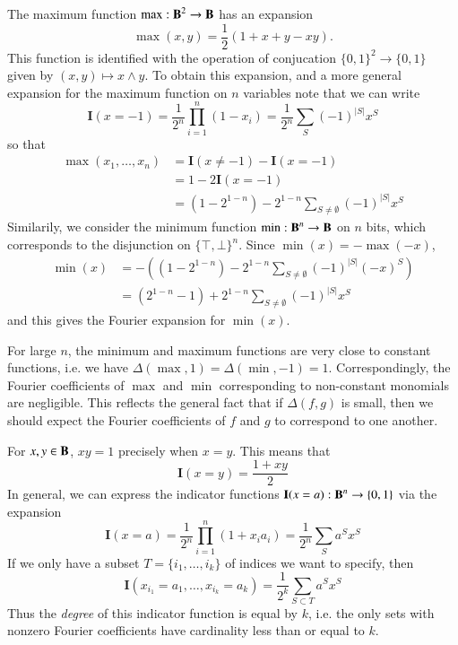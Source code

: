 \begin{example}
    The maximum function $\max: \operatorname{\mathbf{B}}^2 \to \operatorname{\mathbf{B}}$ has an expansion
    \[ \max(x,y) = \frac{1}{2} \left( 1 + x + y - xy \right). \]
    This function is identified with the operation of conjucation $\{ 0, 1 \}^2 \to \{ 0, 1 \}$ given by $(x,y) \mapsto x \wedge y$. To obtain this expansion, and a more general expansion for the maximum function on $n$ variables note that we can write
    \[ \mathbf{I}(x = -1) = \frac{1}{2^n} \prod_{i = 1}^n (1 - x_i) = \frac{1}{2^n} \sum_S (-1)^{|S|} x^S \]
    so that
    \begin{align*}
        \max(x_1, \dots, x_n) &= \mathbf{I}(x \neq -1) - \mathbf{I}(x = -1)\\
        &= 1 - 2 \mathbf{I}(x = -1)\\
        &= (1 - 2^{1-n}) - 2^{1-n} \sum_{S \neq \emptyset} (-1)^{|S|} x^S
    \end{align*}
    Similarily, we consider the minimum function $\min: \operatorname{\mathbf{B}}^n \to \operatorname{\mathbf{B}}$ on $n$ bits, which corresponds to the disjunction on $\{ \top, \bot \}^n$. Since $\min(x) = -\max(-x)$,
    \begin{align*}
        \min(x) &= - \left( ( 1 - 2^{1-n} ) - 2^{1-n} \sum_{S \neq \emptyset} (-1)^{|S|} (-x)^S \right)\\
        &= ( 2^{1-n} - 1 ) + 2^{1-n} \sum_{S \neq \emptyset} (-1)^{|S|} x^S
    \end{align*}
    and this gives the Fourier expansion for $\min(x)$.
\end{example}

For large $n$, the minimum and maximum functions are very close to constant functions, i.e. we have $\Delta(\max, 1) = \Delta(\min, -1) = 1$. Correspondingly, the Fourier coefficients of $\max$ and $\min$ corresponding to non-constant monomials are negligible. This reflects the general fact that if $\Delta(f,g)$ is small, then we should expect the Fourier coefficients of $f$ and $g$ to correspond to one another.

\begin{example}
    For $x,y \in \operatorname{\mathbf{B}}$, $xy = 1$ precisely when $x = y$. This means that
    \[ \mathbf{I}(x = y) = \frac{1 + xy}{2} \]
    In general, we can express the indicator functions $\mathbf{I}(x = a): \operatorname{\mathbf{B}}^n \to \{ 0, 1 \}$ via the expansion
    \[ \mathbf{I}(x = a) = \frac{1}{2^n} \prod_{i = 1}^n \left( 1 + x_i a_i \right) = \frac{1}{2^n} \sum_S a^S x^S \]
    If we only have a subset $T = \{ i_1, \dots, i_k \}$ of indices we want to specify, then
    \[ \mathbf{I}(x_{i_1} = a_1, \dots, x_{i_k} = a_k) = \frac{1}{2^k} \sum_{S \subset T} a^S x^S \]
    Thus the \emph{degree} of this indicator function is equal by $k$, i.e. the only sets with nonzero Fourier coefficients have cardinality less than or equal to $k$.
\end{example}


